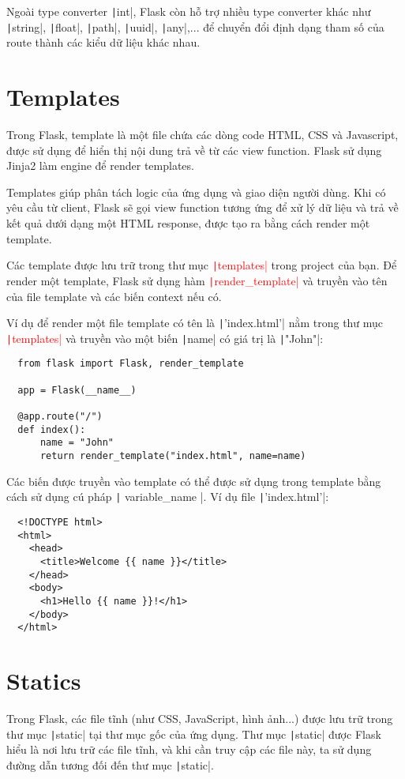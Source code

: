 \documentclass[main.tex]{subfiles}
\begin{document}
Ngoài type converter \texttt|int|, Flask còn hỗ trợ nhiều type converter khác như \texttt|string|, \texttt|float|, \texttt|path|, \texttt|uuid|, \texttt|any|,... để chuyển đổi định dạng tham số của route thành các kiểu dữ liệu khác nhau.

\section{Templates}

Trong Flask, template là một file chứa các dòng code HTML, CSS và Javascript, được sử dụng để hiển thị nội dung trả về từ các view function. Flask sử dụng Jinja2 làm engine để render templates.

Templates giúp phân tách logic của ứng dụng và giao diện người dùng. Khi có yêu cầu từ client, Flask sẽ gọi view function tương ứng để xử lý dữ liệu và trả về kết quả dưới dạng một HTML response, được tạo ra bằng cách render một template.

Các template được lưu trữ trong thư mục \textcolor{red}{\texttt|templates|} trong project của bạn. Để render một template, Flask sử dụng hàm \textcolor{red}{\texttt|render_template|} và truyền vào tên của file template và các biến context nếu có.

Ví dụ để render một file template có tên là \texttt|'index.html'| nằm trong thư mục \textcolor{red}{\texttt|templates|} và truyền vào một biến \texttt|name| có giá trị là \texttt|"John"|:

\begin{verbatim}
  from flask import Flask, render_template

  app = Flask(__name__)

  @app.route("/")
  def index():
      name = "John"
      return render_template("index.html", name=name)
\end{verbatim}

Các biến được truyền vào template có thể được sử dụng trong template bằng cách sử dụng cú pháp \texttt|{{ variable_name }}|. Ví dụ file \texttt|'index.html'|:

\begin{verbatim}
  <!DOCTYPE html>
  <html>
    <head>
      <title>Welcome {{ name }}</title>
    </head>
    <body>
      <h1>Hello {{ name }}!</h1>
    </body>
  </html>
\end{verbatim}

\section{Statics}

Trong Flask, các file tĩnh (như CSS, JavaScript, hình ảnh...) được lưu trữ trong thư mục \texttt|static| tại thư mục gốc của ứng dụng. Thư mục \texttt|static| được Flask hiểu là nơi lưu trữ các file tĩnh, và khi cần truy cập các file này, ta sử dụng đường dẫn tương đối đến thư mục \texttt|static|.
\end{document}
